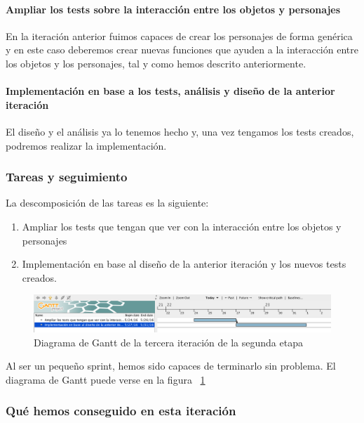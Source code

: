 \paragraph{Ampliar los tests sobre la interacción entre los objetos y personajes} En la iteración anterior fuimos capaces de crear los personajes de forma genérica y en este caso deberemos crear nuevas funciones que ayuden a la interacción entre los objetos y los personajes, tal y como hemos descrito anteriormente.

\paragraph{Implementación en base a los tests, análisis y diseño de la anterior iteración} El diseño y el análisis ya lo tenemos hecho y, una vez tengamos los tests creados, podremos realizar la implementación.

\subsubsection{Tareas y seguimiento}

La descomposición de las tareas es la siguiente:

\begin{enumerate}[label=\bfseries WBS 3.\arabic*]
  \item Ampliar los tests que tengan que ver con la interacción entre los objetos y personajes
  \item Implementación en base al diseño de la anterior iteración y los nuevos tests creados.
\end{enumerate}

\begin{figure}
    \includegraphics[width=\textwidth,height=\textheight,keepaspectratio]{./img/sec2it3.png}
  \caption{Diagrama de Gantt de la tercera iteración de la segunda etapa}
  \label{fig:sec2it3}
\end{figure}

Al ser un pequeño sprint, hemos sido capaces de terminarlo sin problema. El diagrama de Gantt puede verse en la figura ~\ref{fig:sec2it3}

\subsubsection{Qué hemos conseguido en esta iteración}

